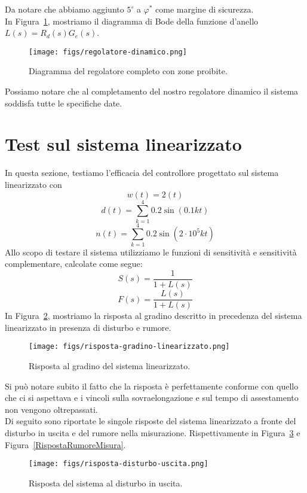 \documentclass[a4paper, 11pt]{article}
\begin{document}
Da notare che abbiamo aggiunto $5^\circ$ a $\varphi^*$ come margine di sicurezza.\\

In Figura~\ref{RegolatoreDinamico}, mostriamo il diagramma di Bode della funzione d'anello $L(s) = R_d(s) G_e(s)$.

\begin{figure}[H]
    \centering
    \texttt{[image: figs/regolatore-dinamico.png]}
    \caption{Diagramma del regolatore completo con zone proibite.}
    \label{RegolatoreDinamico}
\end{figure}

Possiamo notare che al completamento del nostro regolatore dinamico il sistema soddisfa tutte le specifiche date.

\newpage
\section{Test sul sistema linearizzato}

In questa sezione, testiamo l'efficacia del controllore progettato sul sistema linearizzato con 
\[w(t) = 2(t) \]
\[d(t) = \sum^4_{k=1}0.2\sin(0.1kt)\] 
\[n(t) = \sum^4_{k=1}0.2\sin(2\cdot10^5kt)\]
Allo scopo di testare il sistema utilizziamo le funzioni di sensitività e sensitività complementare, calcolate come segue:
\[S(s) = \frac{1}{1+L(s)}\]
\[F(s) = \frac{L(s)}{1+L(s)}\]
In Figura~\ref{RispostaLinearizzataAlGradino}, mostriamo la risposta al gradino descritto in precedenza del sistema linearizzato in presenza di disturbo e rumore.

\begin{figure}[H]
    \centering
    \texttt{[image: figs/risposta-gradino-linearizzato.png]}
    \caption{Risposta al gradino del sistema linearizzato.}
    \label{RispostaLinearizzataAlGradino}
\end{figure}

Si può notare subito il fatto che la risposta è perfettamente conforme con quello che ci si aspettava e i vincoli sulla sovraelongazione e sul tempo di assestamento non vengono oltrepassati.\\

Di seguito sono riportate le singole risposte del sistema linearizzato a fronte del disturbo in uscita e del rumore nella misurazione. Rispettivamente in Figura~\ref{RispostaDisturboUscita} e Figura~\ref{RispostaRumoreMisura}.

\begin{figure}[H]
    \centering
    \texttt{[image: figs/risposta-disturbo-uscita.png]}
    \caption{Risposta del sistema al disturbo in uscita.}
    \label{RispostaDisturboUscita}
\end{figure}
\end{document}
